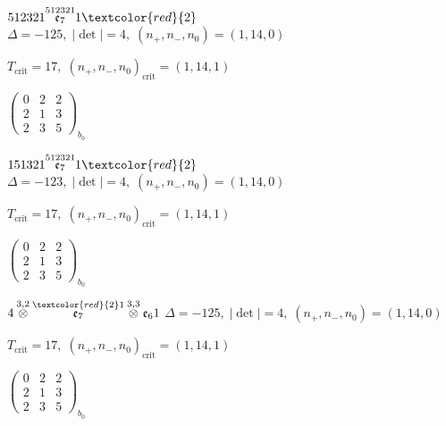 \documentclass[10pt]{article}
\begin{document}
\smallskip

$512321\overset{512321}{\mathfrak{e}_7}1\textcolor{red}{2}$ \quad $\Delta=-125,\; |\det|=4,\; (n_+,n_-,n_0)=(1,14,0)$

\hspace{1em}$T_{\text{crit}}=17,\; (n_+,n_-,n_0)_{\text{crit}}=(1,14,1)$

\hspace{2em}$\left(\begin{smallmatrix}0 & 2 & 2 \\ 2 & 1 & 3 \\ 2 & 3 & 5\end{smallmatrix}\right)_{\!b_0}$

\smallskip

$151321\overset{512321}{\mathfrak{e}_7}1\textcolor{red}{2}$ \quad $\Delta=-123,\; |\det|=4,\; (n_+,n_-,n_0)=(1,14,0)$

\hspace{1em}$T_{\text{crit}}=17,\; (n_+,n_-,n_0)_{\text{crit}}=(1,14,1)$

\hspace{2em}$\left(\begin{smallmatrix}0 & 2 & 2 \\ 2 & 1 & 3 \\ 2 & 3 & 5\end{smallmatrix}\right)_{\!b_0}$

\smallskip

$4\overset{3,2}{\otimes}\overset{\textcolor{red}{2}1}{\mathfrak{e}_7}\overset{3,3}{\otimes}\mathfrak{e}_61$ \quad $\Delta=-125,\; |\det|=4,\; (n_+,n_-,n_0)=(1,14,0)$

\hspace{1em}$T_{\text{crit}}=17,\; (n_+,n_-,n_0)_{\text{crit}}=(1,14,1)$

\hspace{2em}$\left(\begin{smallmatrix}0 & 2 & 2 \\ 2 & 1 & 3 \\ 2 & 3 & 5\end{smallmatrix}\right)_{\!b_0}$

\smallskip
\end{document}
